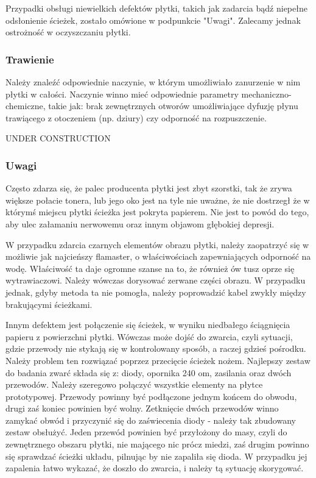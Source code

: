 Przypadki obsługi niewielkich defektów płytki, takich jak zadarcia bądź niepełne odsłonienie ścieżek, zostało omówione w podpunkcie "Uwagi". Zalecamy jednak ostrożność w oczyszczaniu płytki.

\subsubsection{Trawienie}

Należy znaleźć odpowiednie naczynie, w którym umożliwiało zanurzenie w nim płytki w całości. Naczynie winno mieć odpowiednie parametry mechaniczno-chemiczne, takie jak: brak zewnętrznych otworów umożliwiające dyfuzję płynu trawiącego z otoczeniem (np. dziury) czy odporność na rozpuszczenie.

UNDER CONSTRUCTION

\subsubsection{Uwagi}

Często zdarza się, że palec producenta płytki jest zbyt szorstki, tak że zrywa większe połacie tonera, lub jego oko jest na tyle nie uważne, że nie dostrzegł że w którymś miejscu płytki ścieżka jest pokryta papierem. Nie  jest to powód do tego, aby ulec załamaniu nerwowemu oraz innym objawom głębokiej depresji.

W przypadku zdarcia czarnych elementów obrazu płytki, należy zaopatrzyć się w możliwie jak najcieńszy flamaster, o właściwościach zapewniających odporność na wodę. Właściwość ta daje ogromne szanse na to, że również ów tusz oprze się wytrawiaczowi. Należy wówczas dorysować zerwane części obrazu. W przypadku jednak, gdyby metoda ta nie pomogła, należy poprowadzić kabel zwykły między brakującymi ścieżkami. 

Innym defektem jest połączenie się ścieżek, w wyniku niedbałego ściągnięcia papieru z powierzchni płytki. Wówczas może dojść do zwarcia, czyli sytuacji, gdzie przewody nie stykają się w kontrolowany sposób, a raczej gdzieś pośrodku.  Należy problem ten rozwiązać poprzez przecięcie ścieżek nożem. Najlepszy zestaw do badania zwarć składa się z: diody, opornika 240 om, zasilania oraz dwóch przewodów. Należy szeregowo połączyć wszystkie elementy na płytce prototypowej. Przewody powinny być podłączone jednym końcem do obwodu, drugi zaś koniec powinien być wolny. Zetknięcie dwóch przewodów winno zamykać obwód i przyczynić się do zaświecenia diody - należy tak zbudowany zestaw obsłużyć. Jeden przewód powinien być przyłożony do masy, czyli do zewnętrznego obszaru płytki, nie mającego nic prócz miedzi, zaś drugim powinno się sprawdzać ścieżki układu, pilnując by nie zapaliła się dioda. W przypadku jej zapalenia łatwo wykazać, że doszło do zwarcia, i należy tą sytuację skorygować.